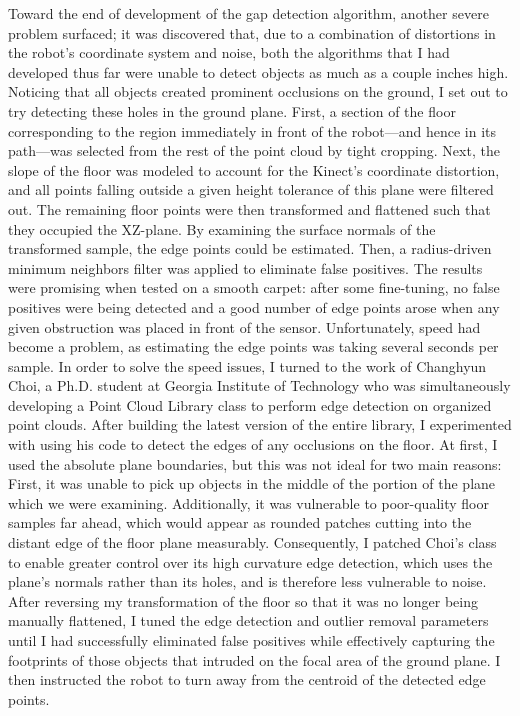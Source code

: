 \documentclass[12pt]{report}
\begin{document}
Toward the end of development of the gap detection algorithm, another severe problem surfaced; it was discovered that, due to a combination of distortions in the robot's coordinate system and noise, both the algorithms that I had developed thus far were unable to detect objects as much as a couple inches high.  Noticing that all objects created prominent occlusions on the ground, I set out to try detecting these holes in the ground plane.  First, a section of the floor corresponding to the region immediately in front of the robot---and hence in its path---was selected from the rest of the point cloud by tight cropping.  Next, the slope of the floor was modeled to account for the Kinect's coordinate distortion, and all points falling outside a given height tolerance of this plane were filtered out.  The remaining floor points were then transformed and flattened such that they occupied the XZ-plane.  By examining the surface normals of the transformed sample, the edge points could be estimated.  Then, a radius-driven minimum neighbors filter was applied to eliminate false positives.  The results were promising when tested on a smooth carpet: after some fine-tuning, no false positives were being detected and a good number of edge points arose when any given obstruction was placed in front of the sensor.  Unfortunately, speed had become a problem, as estimating the edge points was taking several seconds per sample.
In order to solve the speed issues, I turned to the work of Changhyun Choi, a Ph.D. student at Georgia Institute of Technology who was simultaneously developing a Point Cloud Library class to perform edge detection on organized point clouds.  After building the latest version of the entire library, I experimented with using his code to detect the edges of any occlusions on the floor.  At first, I used the absolute plane boundaries, but this was not ideal for two main reasons:  First, it was unable to pick up objects in the middle of the portion of the plane which we were examining.  Additionally, it was vulnerable to poor-quality floor samples far ahead, which would appear as rounded patches cutting into the distant edge of the floor plane measurably.  Consequently, I patched Choi's class to enable greater control over its high curvature edge detection, which uses the plane's normals rather than its holes, and is therefore less vulnerable to noise.  After reversing my transformation of the floor so that it was no longer being manually flattened, I tuned the edge detection and outlier removal parameters until I had successfully eliminated false positives while effectively capturing the footprints of those objects that intruded on the focal area of the ground plane.  I then instructed the robot to turn away from the centroid of the detected edge points.
\end{document}
